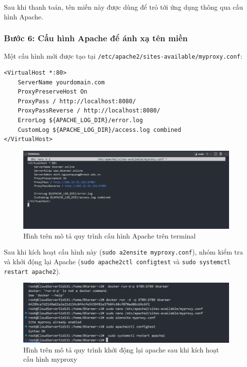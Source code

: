 Sau khi thanh toán, tên miền này được dùng để trỏ tới ứng dụng thông qua cấu hình Apache.

\subsubsection{Bước 6: Cấu hình Apache để ánh xạ tên miền}
Một cấu hình mới được tạo tại \texttt{/etc/apache2/sites-available/myproxy.conf}:
\begin{verbatim}
<VirtualHost *:80>
    ServerName yourdomain.com
    ProxyPreserveHost On
    ProxyPass / http://localhost:8080/
    ProxyPassReverse / http://localhost:8080/
    ErrorLog ${APACHE_LOG_DIR}/error.log
    CustomLog ${APACHE_LOG_DIR}/access.log combined
</VirtualHost>
\end{verbatim}

\begin{figure}[H]
    \centering
    \includegraphics[width=0.9\linewidth]{images/apache-file.png}
    \vspace{0.5cm}
    \caption{Hình trên mô tả quy trình cấu hình Apache trên terminal}
\end{figure}

Sau khi kích hoạt cấu hình này (\texttt{sudo a2ensite myproxy.conf}), nhóm kiểm tra và khởi động lại Apache (\texttt{sudo apache2ctl configtest} và \texttt{sudo systemctl restart apache2}).

\begin{figure}[H]
    \centering
    \includegraphics[width=0.9\linewidth]{images/run-docker-apache.png}
    \vspace{0.5cm}
    \caption{Hình trên mô tả quy trình khởi động lại apache sau khi kích hoạt cấu hình myproxy}
\end{figure}

